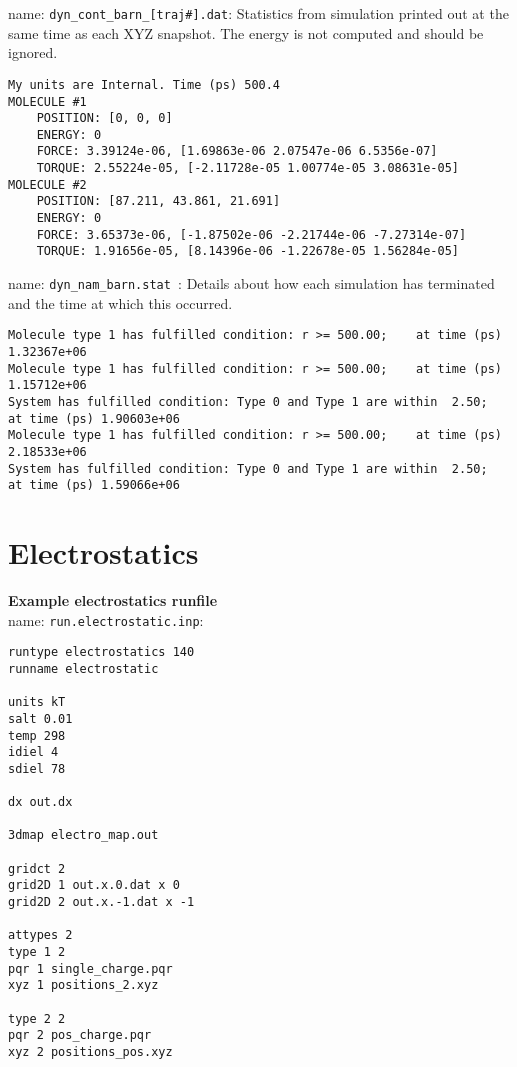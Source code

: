 name: \texttt{dyn\_cont\_barn\_[traj\#].dat}: Statistics from simulation printed out at the same time as each XYZ snapshot. The energy is not computed and should be ignored.

\begin{lstlisting}[style = MyBash]
My units are Internal. Time (ps) 500.4
MOLECULE #1
	POSITION: [0, 0, 0]
	ENERGY: 0
	FORCE: 3.39124e-06, [1.69863e-06 2.07547e-06 6.5356e-07]
	TORQUE: 2.55224e-05, [-2.11728e-05 1.00774e-05 3.08631e-05]
MOLECULE #2
	POSITION: [87.211, 43.861, 21.691]
	ENERGY: 0
	FORCE: 3.65373e-06, [-1.87502e-06 -2.21744e-06 -7.27314e-07]
	TORQUE: 1.91656e-05, [8.14396e-06 -1.22678e-05 1.56284e-05]
\end{lstlisting}
\medskip

name: \texttt{dyn\_nam\_barn.stat }: Details about how each simulation has terminated and the time at which this occurred.
\begin{lstlisting}[style = MyBash]
Molecule type 1 has fulfilled condition: r >= 500.00;	 at time (ps) 1.32367e+06
Molecule type 1 has fulfilled condition: r >= 500.00;	 at time (ps) 1.15712e+06
System has fulfilled condition: Type 0 and Type 1 are within  2.50;	 at time (ps) 1.90603e+06
Molecule type 1 has fulfilled condition: r >= 500.00;	 at time (ps) 2.18533e+06
System has fulfilled condition: Type 0 and Type 1 are within  2.50;	 at time (ps) 1.59066e+06
\end{lstlisting}


\section{Electrostatics}

\textbf{Example electrostatics runfile} \\

name:  \texttt{run.electrostatic.inp}:
\begin{lstlisting}[style = MyBash]
runtype electrostatics 140
runname electrostatic

units kT
salt 0.01
temp 298
idiel 4 
sdiel 78

dx out.dx

3dmap electro_map.out

gridct 2
grid2D 1 out.x.0.dat x 0
grid2D 2 out.x.-1.dat x -1

attypes 2
type 1 2
pqr 1 single_charge.pqr
xyz 1 positions_2.xyz

type 2 2
pqr 2 pos_charge.pqr
xyz 2 positions_pos.xyz
\end{lstlisting}
\medskip

